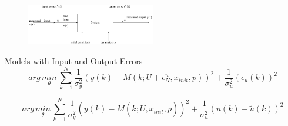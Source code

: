 \begin{figure}[H]
	\centering
  	\includegraphics[width=0.5\textwidth]{./model.pdf}
	\label{model}
\end{figure}
Models with Input and Output Errors
\begin{equation*}
arg \, \underset { \theta  }{ min } \, \sum _{ k-1 }^{ N }{ \frac { 1 }{ { \sigma  }_{ y }^{ 2 } }  } { (y(k)-M(k;U+{ \epsilon  }_{ N }^{ u },{ x }_{ init },p)) }^{ 2 }+\frac { 1 }{ { \sigma  }_{ u }^{ 2 } } { ({ \epsilon  }_{ u }(k)) }^{ 2 }
\end{equation*}


\begin{equation*}
arg \, \underset { \theta  }{ min } \, \sum _{ k-1 }^{ N }{ \frac { 1 }{ { \sigma  }_{ y }^{ 2 } }  } { (y(k)-M(k;\tilde { U } ,{ x }_{ init },p)) }^{ 2 }+\frac { 1 }{ { \sigma  }_{ u }^{ 2 } } { (u(k)-\tilde{ u }(k) ) }^{ 2 }
\end{equation*}